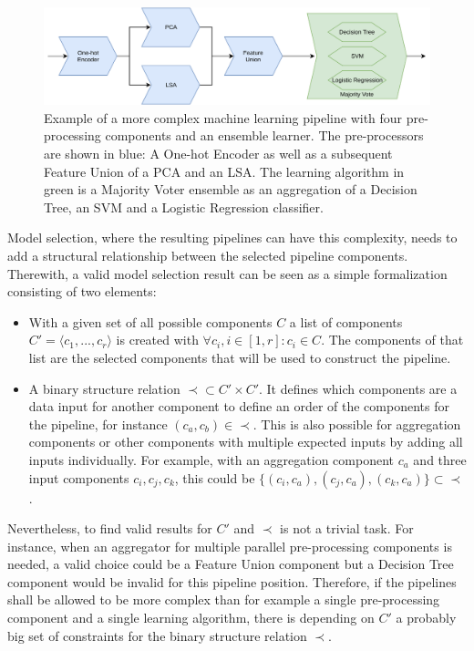 \begin{figure}[ht!]
    \centering
    \includegraphics[width=\textwidth]{gfx/Figures/Theory/ComplexPipeline.pdf}
    \caption[Example of a more complex machine learning pipeline.]{Example of a more complex machine learning pipeline with four pre-processing components and an ensemble learner. The pre-processors are shown in blue: A One-hot Encoder as well as a subsequent Feature Union of a PCA and an LSA. The learning algorithm in green is a Majority Voter ensemble as an aggregation of a Decision Tree, an SVM and a Logistic Regression classifier.}
	\label{fig:theory:complexPipeline}
\end{figure}

Model selection, where the resulting pipelines can have this complexity, needs to add a structural relationship between the selected pipeline components.
Therewith, a valid model selection result can be seen as a simple formalization consisting of two elements:
\begin{itemize}
    \item With a given set of all possible components $C$ a list of components $C' = \langle c_1, ..., c_r\rangle$ is created with $\forall c_i, i \in [1, r] : c_i \in C$.
    The components of that list are the selected components that will be used to construct the pipeline.
    \item A binary structure relation $\prec \subset C' \times C'$. It defines which components are a data input for another component to define an order of the components for the pipeline, for instance $(c_a, c_b) \in \prec$. This is also possible for aggregation components or other components with multiple expected inputs by adding all inputs individually. For example, with an aggregation component $c_a$ and three input components $c_i, c_j, c_k$, this could be $\{(c_i, c_a), (c_j, c_a), (c_k, c_a)\} \subset \prec$. 
\end{itemize}
Nevertheless, to find valid results for $C'$ and $\prec$ is not a trivial task.
For instance, when an aggregator for multiple parallel pre-processing components is needed, a valid choice could be a Feature Union component but a Decision Tree component would be invalid for this pipeline position.\newline
Therefore, if the pipelines shall be allowed to be more complex than for example a single pre-processing component and a single learning algorithm, there is depending on $C'$ a probably big set of constraints for the binary structure relation $\prec$.

